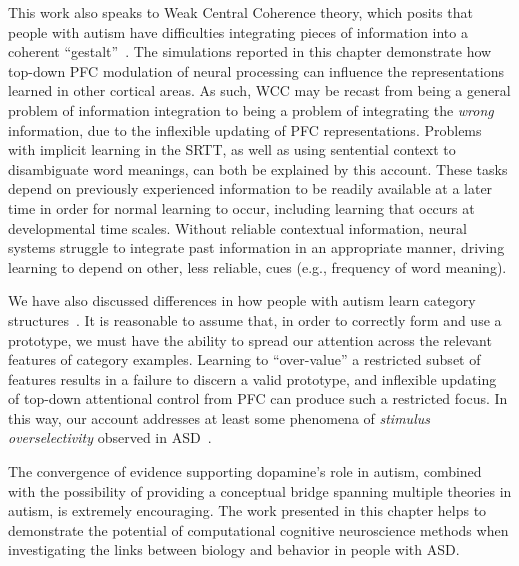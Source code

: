 This work also speaks to Weak Central Coherence theory, which posits that people with autism have difficulties integrating pieces of information into a coherent ``gestalt''~\cite{FrithU:1989:AutismWCC,HappeF:1999:WCC}. The simulations reported in this chapter demonstrate how top-down PFC modulation of neural processing can influence the representations learned in other cortical areas. As such, WCC may be recast from being a general problem of information integration to being a problem of integrating the \emph{wrong} information, due to the inflexible updating of PFC representations. Problems with implicit learning in the SRTT, as well as using sentential context to disambiguate word meanings, can both be explained by this account. These tasks depend on previously experienced information to be readily available at a later time in order for normal learning to occur, including learning that occurs at developmental time scales. Without reliable contextual information, neural systems struggle to integrate past information in an appropriate manner, driving learning to depend on other, less reliable, cues (e.g., frequency of word meaning).

We have also discussed differences in how people with autism learn category structures~\cite{RefWorks:113,StraussMS:2009:Prototype}. It is reasonable to assume that, in order to correctly form and use a prototype, we must have the ability to spread our attention across the relevant features of category examples. Learning to ``over-value'' a restricted subset of features results in a failure to discern a valid prototype, and inflexible updating of top-down attentional control from PFC can produce such a restricted focus. In this way, our account addresses at least some phenomena of \emph{stimulus overselectivity} observed in ASD~\cite{RefWorks:110,RefWorks:112}.

The convergence of evidence supporting dopamine's role in autism, combined with the possibility of providing a conceptual bridge spanning multiple theories in autism, is extremely encouraging. The work presented in this chapter helps to demonstrate the potential of computational cognitive neuroscience methods when investigating the links between biology and behavior in people with ASD.
